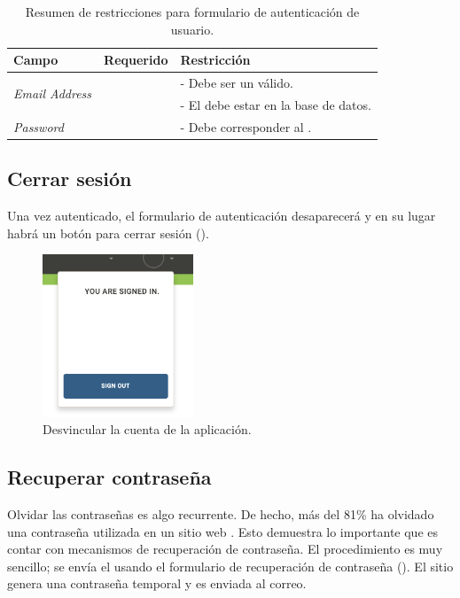 \begin{table}[H]
    \centering
	\begin{tabular}{ |l|c||l| }
		\hline Campo & Requerido & Restricción \\ \hline
		\multirow{2}{*}{\textit{Email Address}} &  \multirow{2}{*}{\checkmark}
				& - Debe ser un \email válido. \\ 
			& 	& - El \email debe estar en la base de datos. \\ \hline
		\multirow{1}{*}{\textit{Password}} 		&  \multirow{1}{*}{\checkmark} & - Debe corresponder al \email. \\ \hline
	\end{tabular}
 	\caption{Resumen de restricciones para formulario de autenticación de usuario.}
    \label{tab:architecture:accounts:signin:form}
\end{table}

\subsection{Cerrar sesión}

Una vez autenticado, el formulario de autenticación desaparecerá y en su lugar habrá un botón para cerrar sesión ().

\begin{figure}[H]
	\centering
	\includegraphics[width=0.4\textwidth]{figuras/architecture/accounts/logout/ui.png}
	\caption{Desvincular la cuenta de la aplicación.}
	\label{figure:accounts:logout:form}
\end{figure}

\subsection{Recuperar contraseña}
Olvidar las contraseñas es algo recurrente. De hecho, más del 81\% ha olvidado una contraseña utilizada en un sitio web \cite{online_berkeley_behavior_toward_password}. Esto demuestra lo importante que es contar con mecanismos de recuperación de contraseña.
El procedimiento es muy sencillo; se envía el \email usando el formulario de recuperación de contraseña (). El sitio genera una contraseña temporal y es enviada al correo.

